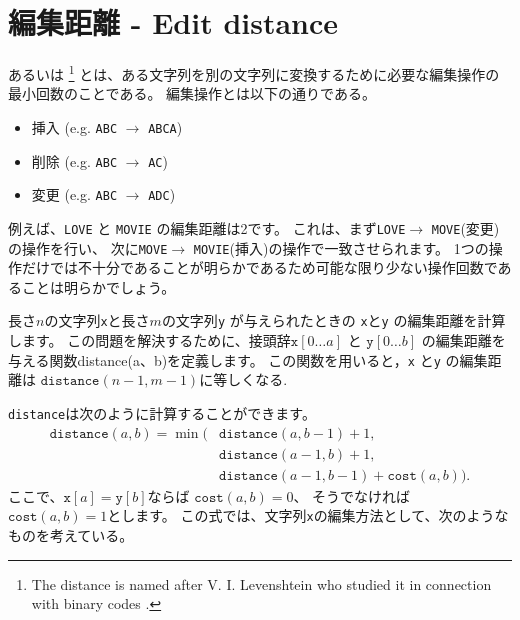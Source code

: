 \section{編集距離 - Edit distance}


 あるいは 
\footnote{The distance
is named after V. I. Levenshtein who studied it in connection with binary codes \cite{lev66}.}
とは、ある文字列を別の文字列に変換するために必要な編集操作の最小回数のことである。
編集操作とは以下の通りである。

\begin{itemize}
\item 挿入 (e.g. \texttt{ABC} $\rightarrow$ \texttt{ABCA})
\item 削除 (e.g. \texttt{ABC} $\rightarrow$ \texttt{AC})
\item 変更 (e.g. \texttt{ABC} $\rightarrow$ \texttt{ADC})
\end{itemize}

例えば、\texttt{LOVE} と \texttt{MOVIE} の編集距離は2です。
これは、まず\texttt{LOVE}$\rightarrow$ \texttt{MOVE}(変更)の操作を行い、
次に\texttt{MOVE}$\rightarrow$ \texttt{MOVIE}(挿入)の操作で一致させられます。
1つの操作だけでは不十分であることが明らかであるため可能な限り少ない操作回数であることは明らかでしょう。

長さ$n$の文字列\texttt{x}と長さ$m$の文字列\texttt{y} が与えられたときの
\texttt{x}と\texttt{y} の編集距離を計算します。
この問題を解決するために、接頭辞$\texttt{x}[0 \ldots a]$ と $\texttt{y}[0 \ldots b]$
の編集距離を与える関数distance(a、b)を定義します。
この関数を用いると，\texttt{x} と\texttt{y}  の編集距離は
$\texttt{distance}(n-1,m-1)$に等しくなる.

\texttt{distance}は次のように計算することができます。
\begin{equation*}
\begin{split}
\texttt{distance}(a,b) = \min(& \texttt{distance}(a,b-1)+1, \\
                           & \texttt{distance}(a-1,b)+1, \\
                           & \texttt{distance}(a-1,b-1)+\texttt{cost}(a,b)).
\end{split}
\end{equation*}
ここで、$\texttt{x}[a]=\texttt{y}[b]$ならば $\texttt{cost}(a,b)=0$、
そうでなければ $\texttt{cost}(a,b)=1$とします。
この式では、文字列\texttt{x}の編集方法として、次のようなものを考えている。

